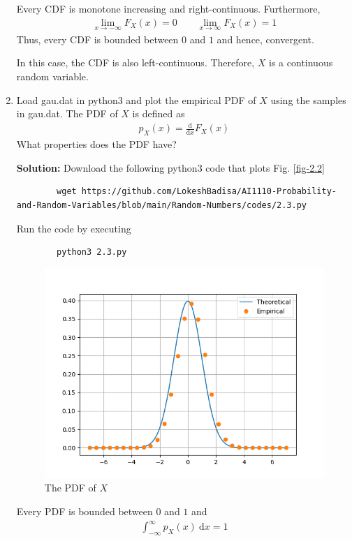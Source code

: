 \documentclass[journal,12pt,twocolumn]{IEEEtran}
\newcommand{\solution}{\noindent \textbf{Solution: }}
\providecommand{\der}[1]{\mathrm{d} #1}
\numberwithin{equation}{section}
\renewcommand\thesection{\arabic{section}}
\begin{document}
\begin{enumerate}[label=\thesection.\arabic*,ref=\thesection.\theenumi]
	Every CDF is monotone increasing and right-continuous. Furthermore,
	\begin{align}
		\lim_{x \to -\infty} F_{X}(x) = 0 \qquad \lim_{x \to \infty} F_{X}(x) = 1
	\end{align}
	Thus, every CDF is bounded between $0$ and $1$ and hence, convergent.
	
	In this case, the CDF is also left-continuous. Therefore, $X$ is a continuous random variable.
	
	\item Load gau.dat in python3 and plot the empirical PDF of $X$ using the samples in gau.dat. The PDF of $X$ is defined as
	\begin{align}
		p_{X}(x) = \frac{\der{}}{\der{x}}F_{X}(x)
	\end{align}
	What properties does the PDF have?
	
	\solution Download the following python3 code that plots Fig. \ref{fig-2.2}
	\begin{lstlisting}
		wget https://github.com/LokeshBadisa/AI1110-Probability-and-Random-Variables/blob/main/Random-Numbers/codes/2.3.py
	\end{lstlisting}
	Run the code by executing
	\begin{lstlisting}
		python3 2.3.py
	\end{lstlisting}
	\begin{figure}
		\centering
		\includegraphics[width=\columnwidth]{./figs/2.3.png}
		\caption{The PDF of $X$}
		\label{fig-2.3}
	\end{figure}
	
	Every PDF is bounded between $0$ and $1$ and
	\begin{align}
		\int_{-\infty}^{\infty} p_{X}(x) ~\mathrm{d}x = 1
	\end{align}
	

\end{enumerate}
\end{document}
